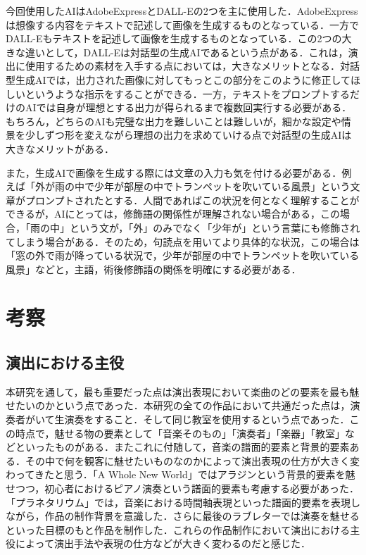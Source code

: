 今回使用したAIはAdobeExpress\cite{adobeEX}とDALL-Eの2つを主に使用した．AdobeExpressは想像する内容をテキストで記述して画像を生成するものとなっている．一方でDALL-Eもテキストを記述して画像を生成するものとなっている．この2つの大きな違いとして，DALL-Eは対話型の生成AIであるという点がある．これは，演出に使用するための素材を入手する点においては，大きなメリットとなる．対話型生成AIでは，出力された画像に対してもっとこの部分をこのように修正してほしいというような指示をすることができる．一方，テキストをプロンプトするだけのAIでは自身が理想とする出力が得られるまで複数回実行する必要がある．もちろん，どちらのAIも完璧な出力を難しいことは難しいが，細かな設定や情景を少しずつ形を変えながら理想の出力を求めていける点で対話型の生成AIは大きなメリットがある．

また，生成AIで画像を生成する際には文章の入力も気を付ける必要がある．例えば「外が雨の中で少年が部屋の中でトランペットを吹いている風景」という文章がプロンプトされたとする．人間であればこの状況を何となく理解することができるが，AIにとっては，修飾語の関係性が理解されない場合がある，この場合，「雨の中」という文が，「外」のみでなく「少年が」という言葉にも修飾されてしまう場合がある．そのため，句読点を用いてより具体的な状況，この場合は「窓の外で雨が降っている状況で，少年が部屋の中でトランペットを吹いている風景」などと，主語，術後修飾語の関係を明確にする必要がある．


\section{考察}
\subsection{演出における主役}
本研究を通して，最も重要だった点は演出表現において楽曲のどの要素を最も魅せたいのかという点であった．本研究の全ての作品において共通だった点は，演奏者がいて生演奏をすること．そして同じ教室を使用するという点であった．この時点で，魅せる物の要素として「音楽そのもの」「演奏者」「楽器」「教室」などといったものがある．またこれに付随して，音楽の譜面的要素と背景的要素ある．その中で何を観客に魅せたいものなのかによって演出表現の仕方が大きく変わってきたと思う．「A Whole New World」ではアラジンという背景的要素を魅せつつ，初心者におけるピアノ演奏という譜面的要素も考慮する必要があった．「プラネタリウム」では，音楽における時間軸表現といった譜面的要素を表現しながら，作品の制作背景を意識した．さらに最後のラブレターでは演奏を魅せるといった目標のもと作品を制作した．これらの作品制作において演出における主役によって演出手法や表現の仕方などが大きく変わるのだと感じた．


